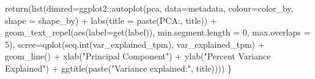 \documentclass[
]{article}
\newenvironment{Shaded}{\begin{snugshade}}{\end{snugshade}}
\newcommand{\AttributeTok}[1]{\textcolor[rgb]{0.77,0.63,0.00}{#1}}
\newcommand{\DecValTok}[1]{\textcolor[rgb]{0.00,0.00,0.81}{#1}}
\newcommand{\FunctionTok}[1]{\textcolor[rgb]{0.00,0.00,0.00}{#1}}
\newcommand{\NormalTok}[1]{#1}
\newcommand{\SpecialCharTok}[1]{\textcolor[rgb]{0.00,0.00,0.00}{#1}}
\newcommand{\StringTok}[1]{\textcolor[rgb]{0.31,0.60,0.02}{#1}}
\begin{document}
\begin{Shaded}
\begin{Highlighting}[]
  \FunctionTok{return}\NormalTok{(}\FunctionTok{list}\NormalTok{(}\AttributeTok{dimred=}\NormalTok{ggplot2}\SpecialCharTok{::}\FunctionTok{autoplot}\NormalTok{(pca, }\AttributeTok{data=}\NormalTok{metadata, }\AttributeTok{colour=}\NormalTok{color\_by, }\AttributeTok{shape =}\NormalTok{ shape\_by) }\SpecialCharTok{+} \FunctionTok{labs}\NormalTok{(}\AttributeTok{title =} \FunctionTok{paste}\NormalTok{(}\StringTok{\textquotesingle{}PCA:\textquotesingle{}}\NormalTok{, title)) }\SpecialCharTok{+} \FunctionTok{geom\_text\_repel}\NormalTok{(}\FunctionTok{aes}\NormalTok{(}\AttributeTok{label=}\FunctionTok{get}\NormalTok{(label)), }\AttributeTok{min.segment.length =} \DecValTok{0}\NormalTok{, }\AttributeTok{max.overlaps =} \DecValTok{5}\NormalTok{),}
              \AttributeTok{scree=}\FunctionTok{qplot}\NormalTok{(}\FunctionTok{seq.int}\NormalTok{(var\_explained\_tpm), var\_explained\_tpm) }\SpecialCharTok{+} 
                \FunctionTok{geom\_line}\NormalTok{() }\SpecialCharTok{+} 
                \FunctionTok{xlab}\NormalTok{(}\StringTok{"Principal Component"}\NormalTok{) }\SpecialCharTok{+} 
                \FunctionTok{ylab}\NormalTok{(}\StringTok{"Percent Variance Explained"}\NormalTok{) }\SpecialCharTok{+}
                \FunctionTok{ggtitle}\NormalTok{(}\FunctionTok{paste}\NormalTok{(}\StringTok{"Variance explained:"}\NormalTok{, title))))}
\NormalTok{\}}
\end{Highlighting}
\end{Shaded}
\end{document}
